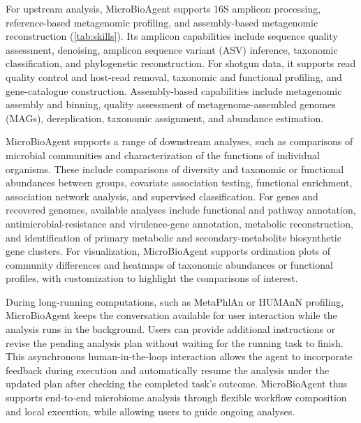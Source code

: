 \documentclass[10pt,letterpaper]{article}
\begin{document}
For upstream analysis, MicroBioAgent supports 16S amplicon processing,
reference-based metagenomic profiling, and assembly-based metagenomic
reconstruction (\cref{tab:skills}).  Its amplicon capabilities include sequence
quality assessment, denoising, amplicon sequence variant (ASV) inference, taxonomic
classification, and phylogenetic reconstruction.  For shotgun data, it supports
read quality control and host-read removal, taxonomic and functional profiling,
and gene-catalogue construction.  Assembly-based capabilities include
metagenomic assembly and binning, quality assessment of metagenome-assembled
genomes (MAGs), dereplication,
taxonomic assignment, and abundance estimation.

MicroBioAgent supports a range of downstream analyses, such as comparisons of
microbial communities and characterization of the functions of individual
organisms.  These include comparisons of diversity and taxonomic or functional
abundances between groups, covariate association testing, functional enrichment,
association network analysis, and supervised classification.
For genes and recovered genomes, available
analyses include functional and pathway annotation, antimicrobial-resistance
and virulence-gene annotation, metabolic reconstruction, and identification of
primary metabolic and secondary-metabolite biosynthetic gene clusters.
For visualization, MicroBioAgent supports ordination plots of community
differences and heatmaps of taxonomic abundances or functional profiles,
with customization to highlight the comparisons of interest.

During long-running computations, such as MetaPhlAn or HUMAnN profiling,
MicroBioAgent keeps the conversation available for user interaction while the
analysis runs in the background.  Users can provide additional instructions or
revise the pending analysis plan without waiting for the running task to finish.
This asynchronous human-in-the-loop interaction allows the agent to incorporate
feedback during execution and automatically resume the analysis under the
updated plan after checking the completed task's outcome.  MicroBioAgent thus
supports end-to-end microbiome analysis through flexible workflow composition
and local execution, while allowing users to guide ongoing analyses.
\end{document}
